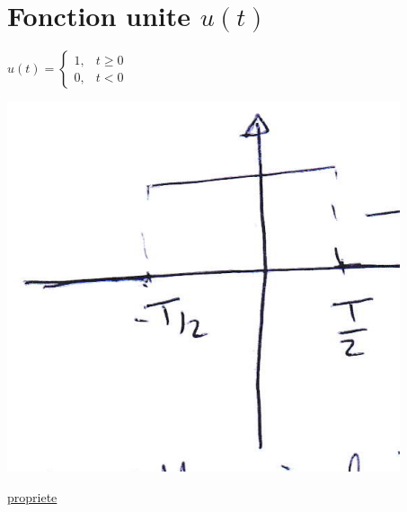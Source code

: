 \documentclass[12pt]{book}
\begin{document}
        \section{Fonction unite $u(t)$}
            \begin{center}
                \begin{minipage}{0.49\linewidth}
                    $u(t) = 
                    \begin{cases}
                        1, & t \geq 0 \\
                        0, & t < 0
                      \end{cases}
                      $
                \end{minipage}
                \begin{minipage}{0.39\linewidth}
                    \includegraphics[width = \linewidth]{pic/fonctionunite.png}
                \end{minipage}
            \end{center}
            \underline{propriete} \\ 
\end{document}
